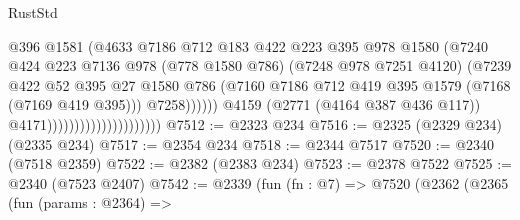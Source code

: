 \begin{lexlean}{RustStd}
\begin{coremodule}
                                                    @396
                                                    @1581
                                                    (@4633
                                                      @7186
                                                      @712
                                                      @183
                                                      @422
                                                      @223
                                                      @395
                                                      @978
                                                      @1580
                                                      (@7240
                                                        @424
                                                        @223
                                                        @7136
                                                        @978
                                                        (@778 @1580 @786)
                                                        (@7248 @978 @7251 @4120)
                                                        (@7239
                                                          @422
                                                          @52
                                                          @395
                                                          @27
                                                          @1580
                                                          @786
                                                          (@7160
                                                            @7186
                                                            @712
                                                            @419
                                                            @395
                                                            @1579
                                                            (@7168 (@7169 @419 @395)))
                                                          @7258))))))
                                              @4159
                                              (@2771 (@4164 @387 @436 @117))
                                              @4171)))))))))))))))))))))
@7512 := @2323 @234
@7516 := @2325 (@2329 @234) (@2335 @234)
@7517 := @2354 @234
@7518 := @2344 @7517
@7520 := @2340 (@7518 @2359)
@7522 := @2382 (@2383 @234)
@7523 := @2378 @7522
@7525 := @2340 (@7523 @2407)
@7542 := @2339
    (fun (fn : @7) =>
    @7520
      (@2362
        (@2365
          (fun (params : @2364) =>

\end{coremodule}
\end{lexlean}
